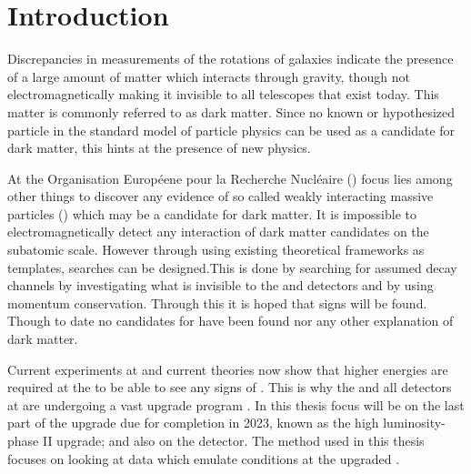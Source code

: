 \chapter{Introduction}\label{cha:intro}
Discrepancies in measurements of the rotations of galaxies indicate the presence of a large amount of matter which interacts through gravity, though not electromagnetically making it invisible to all telescopes that exist today. This matter is commonly referred to as dark matter. Since no known or hypothesized particle in the standard model of particle physics can be used as a candidate for dark matter, this hints at the presence of new physics. 

At the Organisation Européene pour la Recherche Nucléaire (\abbrCERN) focus lies among other things to discover any evidence of so called weakly interacting massive particles (\abbrWIMPS) which may be a candidate for dark matter. It is impossible to electromagnetically detect any interaction of dark matter candidates on the subatomic scale. However through using existing theoretical frameworks as templates, searches can be designed.This is done by searching for assumed decay channels by investigating what is invisible to the \abbrATLAS and \abbrCMS detectors and by using momentum conservation. Through this it is hoped that signs will be found. Though to date no candidates for \abbrWIMPS have been found nor any other explanation of dark matter. 

Current experiments at \abbrCERN and current theories now show that higher energies are required at the \abbrLHC to be able to see any signs of \abbrWIMPS . This is why the \abbrLHC and all detectors at \abbrCERN are undergoing a vast upgrade program \citep{ATLAS:LOI2}.
In this thesis focus will be on the last part of the upgrade due for completion in 2023, known as the high luminosity-\abbrLHC phase II upgrade; and also on the \abbrATLAS detector. The method used in this thesis focuses on looking at data which emulate conditions at the upgraded \abbrLHC .

\newpage
